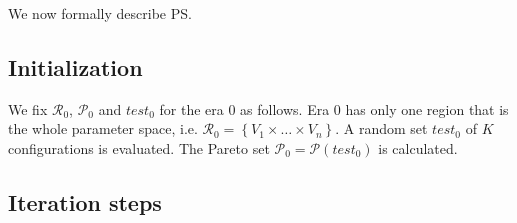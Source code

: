 We now formally describe PS.

\subsection{Initialization}
We fix $\mathcal{R}_0$, $\mathscr{P}_0$ and $test_0$ for the era $0$ as follows. Era $0$ has only one region that is the whole parameter space,
i.e. $\mathcal{R}_{0}=\left\{ V_{1}\times\dots\times V_{n}\right\} $.
A random set $test_{0}$ of $K$ configurations is evaluated. The
Pareto set $\mathscr{P}_{0}=\mathscr{P}\left(test_{0}\right)$ is
calculated.



\subsection{Iteration steps}

